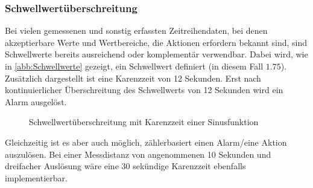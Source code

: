 \subsubsection{Schwellwertüberschreitung}
Bei vielen gemessenen und sonstig erfassten Zeitreihendaten, bei denen akzeptierbare Werte und Wertbereiche, die Aktionen erfordern bekannt sind, sind Schwellwerte bereits ausreichend oder komplementär verwendbar. Dabei wird, wie in \autoref{abb:Schwellwerte} gezeigt, ein Schwellwert definiert (in diesem Fall $1.75$). Zusätzlich dargestellt ist eine Karenzzeit von 12 Sekunden. Erst nach kontinuierlicher Überschreitung des Schwellwerts von 12 Sekunden wird ein Alarm ausgelöst. 
\begin{figure}[H]
\centering
{}
\caption{Schwellwertüberschreitung mit Karenzzeit einer Sinusfunktion}
\label{abb:Schwellwerte}
\end{figure}
Gleichzeitig ist es aber auch möglich, zählerbasiert einen Alarm/eine Aktion auszulösen. Bei einer Messdistanz von angenommenen 10 Sekunden und dreifacher Auslösung wäre eine 30 sekündige Karenzzeit ebenfalls implementierbar.

